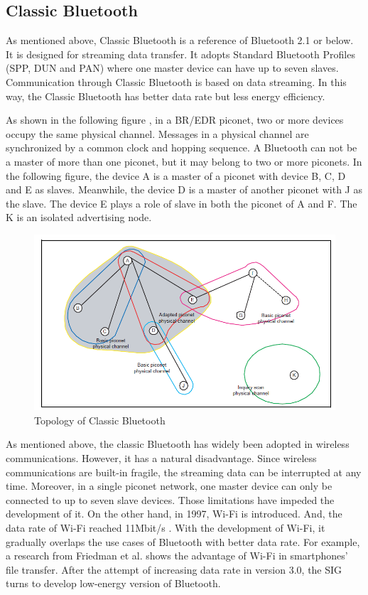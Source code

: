 \documentclass{Nan_Thesis}
\begin{document}
\subsection{Classic Bluetooth}
As mentioned above, Classic Bluetooth is a reference of Bluetooth 2.1 or below. It is designed for streaming data transfer. It adopts Standard Bluetooth Profiles (SPP, DUN and PAN) where one master device can have up to seven slaves. Communication through Classic Bluetooth is based on data streaming. In this way, the Classic Bluetooth has better data rate but less energy efficiency. 

As shown in the following figure \cite{bluetooth2010bluetooth}, in a BR/EDR piconet, two or more devices occupy the same physical channel. Messages in a physical channel are synchronized by a common clock and hopping sequence. A Bluetooth can not be a master of more than one piconet, but it may belong to two or more piconets. In the following figure, the device A is a master of a piconet with device B, C, D and E as slaves. Meanwhile, the device D is a master of another piconet with J as the slave. The device E plays a role of slave in both the piconet of A and F. The K is an isolated advertising node.

\begin{figure}[h]
  \centering 
      \includegraphics[scale=0.6]{pic/classicbluetoothtopology.png} 
  \caption{Topology of Classic Bluetooth \cite{bluetooth2010bluetooth}}
\end{figure} 

As mentioned above, the classic Bluetooth has widely been adopted in wireless communications. However, it has a natural disadvantage. Since wireless communications are built-in fragile, the streaming data can be interrupted at any time. Moreover, in a single piconet network, one master device can only be connected to up to seven slave devices. Those limitations have impeded the development of it. On the other hand, in 1997, Wi-Fi is introduced. And, the data rate of Wi-Fi reached 11Mbit/s \cite{lan2003part}. With the development of Wi-Fi, it gradually overlaps the use cases of Bluetooth with better data rate. For example, a research from Friedman et al. \cite{friedman2013power} shows the advantage of Wi-Fi in smartphones’ file transfer. After the attempt of increasing data rate in version 3.0, the SIG turns to develop low-energy version of Bluetooth. 
\end{document}
